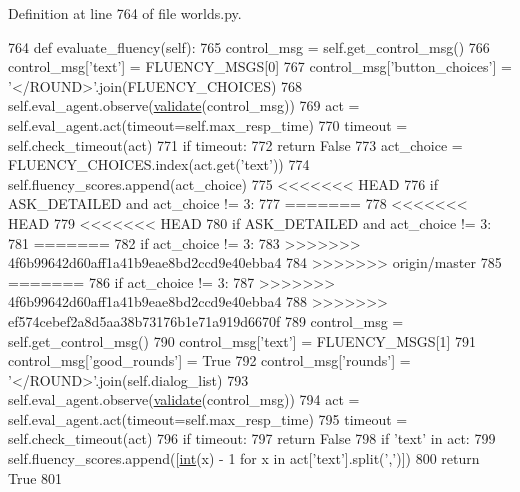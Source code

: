 Definition at line 764 of file worlds.\+py.


\begin{DoxyCode}
764     \textcolor{keyword}{def }evaluate\_fluency(self):
765         control\_msg = self.get\_control\_msg()
766         control\_msg[\textcolor{stringliteral}{'text'}] = FLUENCY\_MSGS[0]
767         control\_msg[\textcolor{stringliteral}{'button\_choices'}] = \textcolor{stringliteral}{'</ROUND>'}.join(FLUENCY\_CHOICES)
768         self.eval\_agent.observe(\hyperlink{namespaceparlai_1_1core_1_1worlds_afc3fad603b7bce41dbdc9cdc04a9c794}{validate}(control\_msg))
769         act = self.eval\_agent.act(timeout=self.max\_resp\_time)
770         timeout = self.check\_timeout(act)
771         \textcolor{keywordflow}{if} timeout:
772             \textcolor{keywordflow}{return} \textcolor{keyword}{False}
773         act\_choice = FLUENCY\_CHOICES.index(act.get(\textcolor{stringliteral}{'text'}))
774         self.fluency\_scores.append(act\_choice)
775 <<<<<<< HEAD
776         \textcolor{keywordflow}{if} ASK\_DETAILED \textcolor{keywordflow}{and} act\_choice != 3:
777 =======
778 <<<<<<< HEAD
779 <<<<<<< HEAD
780         \textcolor{keywordflow}{if} ASK\_DETAILED \textcolor{keywordflow}{and} act\_choice != 3:
781 =======
782         \textcolor{keywordflow}{if} act\_choice != 3:
783 >>>>>>> 4f6b99642d60aff1a41b9eae8bd2ccd9e40ebba4
784 >>>>>>> origin/master
785 =======
786         \textcolor{keywordflow}{if} act\_choice != 3:
787 >>>>>>> 4f6b99642d60aff1a41b9eae8bd2ccd9e40ebba4
788 >>>>>>> ef574cebef2a8d5aa38b73176b1e71a919d6670f
789             control\_msg = self.get\_control\_msg()
790             control\_msg[\textcolor{stringliteral}{'text'}] = FLUENCY\_MSGS[1]
791             control\_msg[\textcolor{stringliteral}{'good\_rounds'}] = \textcolor{keyword}{True}
792             control\_msg[\textcolor{stringliteral}{'rounds'}] = \textcolor{stringliteral}{'</ROUND>'}.join(self.dialog\_list)
793             self.eval\_agent.observe(\hyperlink{namespaceparlai_1_1core_1_1worlds_afc3fad603b7bce41dbdc9cdc04a9c794}{validate}(control\_msg))
794             act = self.eval\_agent.act(timeout=self.max\_resp\_time)
795             timeout = self.check\_timeout(act)
796             \textcolor{keywordflow}{if} timeout:
797                 \textcolor{keywordflow}{return} \textcolor{keyword}{False}
798             \textcolor{keywordflow}{if} \textcolor{stringliteral}{'text'} \textcolor{keywordflow}{in} act:
799                 self.fluency\_scores.append([\hyperlink{namespacelanguage__model_1_1eval__ppl_a7d12ee00479673c5c8d1f6d01faa272a}{int}(x) - 1 \textcolor{keywordflow}{for} x \textcolor{keywordflow}{in} act[\textcolor{stringliteral}{'text'}].split(\textcolor{stringliteral}{','})])
800         \textcolor{keywordflow}{return} \textcolor{keyword}{True}
801 
\end{DoxyCode}
